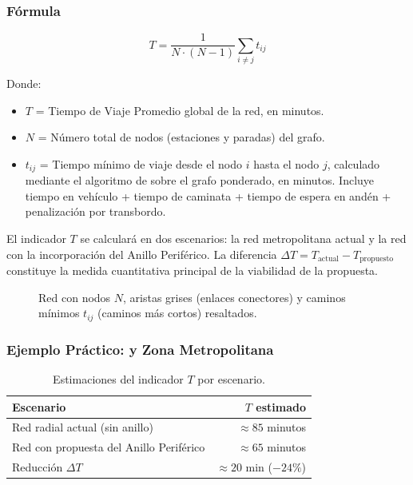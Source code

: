 \subsubsection{Fórmula}

\begin{equation}
    T = \frac{1}{N \cdot (N-1)} \sum_{i \neq j} t_{ij}
    \label{eq:tiempo-promedio}
\end{equation}

Donde:
\begin{itemize}
    \item $T$ = Tiempo de Viaje Promedio global de la red, en minutos.
    \item $N$ = Número total de nodos (estaciones y paradas) del grafo.
    \item $t_{ij}$ = Tiempo mínimo de viaje desde el nodo $i$ hasta el nodo $j$,
    calculado mediante el algoritmo de \dijkstra{} sobre el grafo ponderado,
    en minutos. Incluye tiempo en vehículo + tiempo de caminata + tiempo de
    espera en andén + penalización por transbordo.
\end{itemize}

El indicador $T$ se calculará en dos escenarios: la red metropolitana actual y la red
con la incorporación del Anillo Periférico. La diferencia
$\Delta T = T_{\text{actual}} - T_{\text{propuesto}}$ constituye la medida
cuantitativa principal de la viabilidad de la propuesta.

\begin{figure}[H]
    \centering
    \caption[Diagrama del indicador de Tiempo de Viaje Promedio $T$]{Red con
    nodos $N$, aristas grises (enlaces conectores) y caminos mínimos
    $t_{ij}$ (caminos más cortos) resaltados.}
    \label{fig:indicador-T}
\end{figure}


\subsubsection{Ejemplo Práctico: \cdmx{} y Zona Metropolitana}

\begin{table}[H]
    \centering
    \caption{Estimaciones del indicador $T$ por escenario.}
    \label{tab:tiempo-promedio}
    \begin{tabularx}{\textwidth}{X r}
        \toprule
        \textbf{Escenario} & \textbf{$T$ estimado} \\
        \midrule
        Red radial actual (sin anillo) & $\approx 85$ minutos \\
        Red con propuesta del Anillo Periférico & $\approx 65$ minutos \\
        Reducción $\Delta T$ & $\approx 20$ min ($-24\%$) \\
        \bottomrule
    \end{tabularx}
\end{table}

